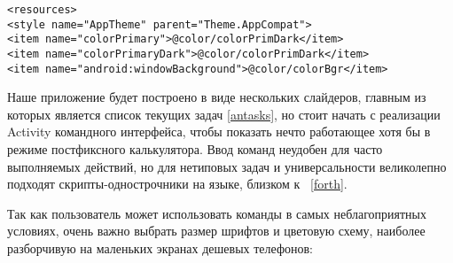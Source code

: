 \begin{lstlisting}[title=Android/app/src/main/res/values/styles.xml]
<resources>
<style name="AppTheme" parent="Theme.AppCompat">
<item name="colorPrimary">@color/colorPrimDark</item>
<item name="colorPrimaryDark">@color/colorPrimDark</item>
<item name="android:windowBackground">@color/colorBgr</item>
\end{lstlisting}

\label{anconsole}

Наше приложение будет построено в виде нескольких слайдеров, главным из которых является список
текущих задач \ref{antasks}, но стоит начать с реализации Activity командного
интерфейса, чтобы показать нечто работающее хотя бы в режиме постфиксного
калькулятора. Ввод команд неудобен для часто выполняемых действий, но для
нетиповых задач и универсальности великолепно подходят скрипты-однострочники на
языке, близком к \F\ \ref{forth}.

Так как пользователь может использовать команды в самых неблагоприятных
условиях, очень важно выбрать размер шрифтов и цветовую схему, наиболее
разборчивую на маленьких экранах дешевых телефонов:


\secup
